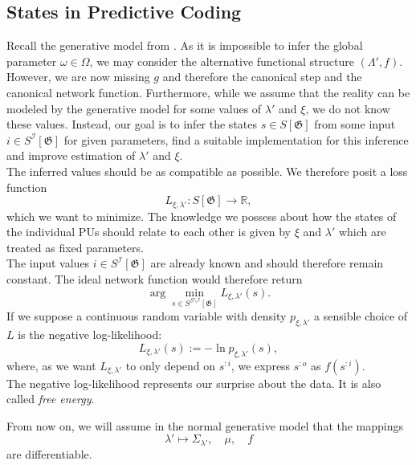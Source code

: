 \documentclass[a4paper,11pt]{report}
\begin{document}
\subsection{States in Predictive Coding}\label{subsec:theory-states-predicode}

\begin{Par}
Recall the generative model from . As it is impossible to infer the global parameter $\omega\in\Omega$, we may consider the alternative functional structure $(\Lambda',f)$. However, we are now missing $g$ and therefore the canonical step and the canonical network function. Furthermore, while we assume that the reality can be modeled by the generative model for some values of $\lambda'$ and $\xi$, we do not know these values. Instead, our goal is to infer the states $s\in S[\mathfrak{G}]$ from some input $i\in S^{\mathcal{I}}[\mathfrak{G}]$ for given parameters, find a suitable implementation for this inference and improve estimation of $\lambda'$ and $\xi$.\\
The inferred values should be as compatible as possible. We therefore posit a loss function
\begin{equation}
L_{\xi,\lambda'}:S[\mathfrak{G}]\to\mathbb{R},
\end{equation}
which we want to minimize. The knowledge we possess about how the states of the individual PUs should relate to each other is given by $\xi$ and $\lambda'$ which are treated as fixed parameters.\\
The input values $i\in S^{\mathcal{I}}[\mathfrak{G}]$ are already known and should therefore remain constant. The ideal network function would therefore return
\begin{equation}
\arg\min_{s\in S^{\mathcal{G}\setminus\mathcal{I}}[\mathfrak{G}]}L_{\xi,\lambda'}(s).
\end{equation}
If we suppose a continuous random variable with density $p_{\xi,\lambda'}$ a sensible choice of $L$ is the negative log-likelihood:
\begin{equation}
L_{\xi,\lambda'}(s):=-\ln p_{\xi,\lambda'}(s),
\end{equation}
where, as we want $L_{\xi,\lambda'}$ to only depend on $s^{:i}$, we express $s^{:o}$ as $f(s^{:i})$.\\
The negative log-likelihood represents our surprise about the data. It is also called \emph{free energy}.
\end{Par}

\begin{Par}
From now on, we will assume in the normal generative model that the mappings
\[
\lambda'\mapsto\Sigma_{\lambda'},
\quad
\mu,
\quad
f
\]
are differentiable.
\end{Par}
\end{document}
